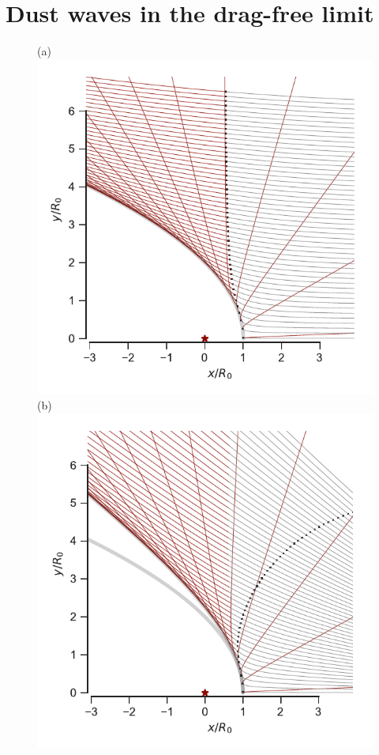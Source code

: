 
\section{Dust waves in the drag-free limit}
\label{sec:gas-free-bow}


\begin{figure}
  (a)\\
  \includegraphics[width=\linewidth]{figs/dust-trajectories}
  (b)\\
  \includegraphics[width=\linewidth]{figs/dust-divergent}

\end{figure}
